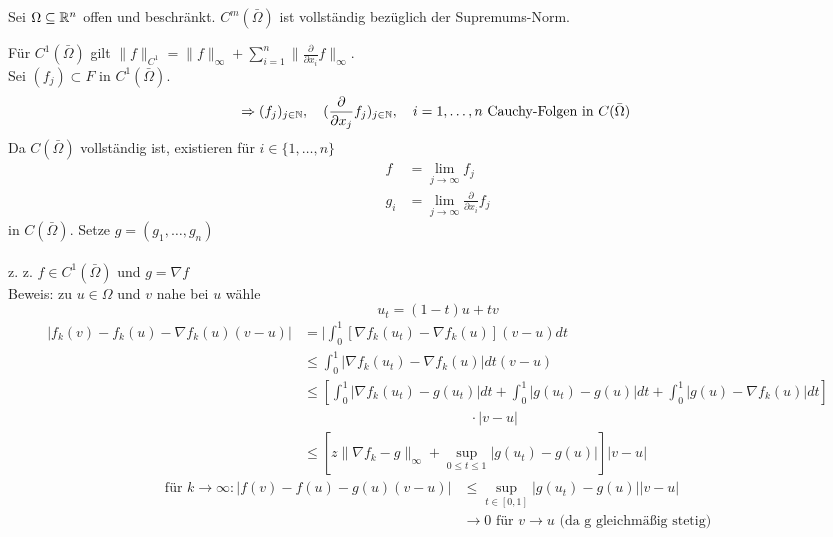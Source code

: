 \begin{beispiel}
	Sei $\Omega \subseteq \mathbb{R}^{n}$ offen und beschränkt. $C^{m}(\bar \Omega)$ ist vollständig bezüglich der Supremums-Norm.	
	\begin{beweis}
		Für $C^{1}(\bar \Omega)$ gilt $\| f \|_{C^{1}} = \| f \|_{\infty} + \sum_{i = 1}^{n}  \| \frac{\partial}{\partial x_{i}} f \|_{\infty}$. \\
		 Sei $(f_{j}) \subset F$ in $C^{1}(\bar \Omega)$.
		 \[ \Rightarrow (f_{j})_{j \in \MdN}, \quad (\frac{\partial}{\partial x_{j}} f_{j})_{j \in \MdN}, \quad i = 1, \dotsc, n \text{ Cauchy-Folgen in } C(\bar \Omega) \]
		 Da $C(\bar \Omega)$ vollständig ist, existieren für $i \in \{ 1, \dotsc, n \} $
		 	\begin{align*}
		 		f & = \lim_{j \rightarrow \infty} f_{j} \\
		 		g_{i} & = \lim_{j \rightarrow \infty} \frac{\partial}{\partial x_{i}} f_{j}
		 	\end{align*}
		 in $C(\bar \Omega)$. Setze $g = (g_{1}, \dotsc, g_{n})$ \\ \\
		 z. z. $f \in C^{1}(\bar \Omega)$ und $g = \nabla f$ \\
		 Beweis: zu $u \in \Omega$ und $v$ nahe bei $u$ wähle
		 \[ u_{t} = (1 - t) u + t v \]
		 \begin{align*}
		 	| f_{k}(v) - f_{k} (u) - \nabla f_{k}(u) (v - u) | & = | \int_{0}^{1} [ \nabla f_{k} (u_{t}) - \nabla f_{k} (u) ] (v - u) dt \\
		 		& \leq  \int_{0}^{1} | \nabla f_{k} (u_{t}) - \nabla f_{k} (u) | dt (v - u) \\
		 		& \leq \left[ \int_{0}^{1} | \nabla f_{k}(u_{t}) - g(u_{t}) | dt + \int_{0}^{1} | g(u_{t}) - g(u) | dt + \int_{0}^{1} | g(u) - \nabla f_{k}(u) | dt \right] \\
		 		&  \hspace{5cm} \cdot |v - u| \\
		 		& \leq \left[ z \| \nabla f_{k} - g \|_{\infty} + \sup_{0 \leq t \leq 1} | g(u_{t}) - g(u) | \right] |v - u|
 		 \end{align*}
 		 \begin{align*}
 		 	\text{für } k \rightarrow \infty: | f(v) - f(u) - g(u)(v - u) | & \leq \sup_{t \in [0, 1]} | g(u_{t}) - g(u) | |v - u| \\
 		 		& \rightarrow 0 \text{ für } v \rightarrow u \text{ (da g gleichmä{\ss}ig stetig)}
 		 \end{align*} 
	\end{beweis}
\end{beispiel}

